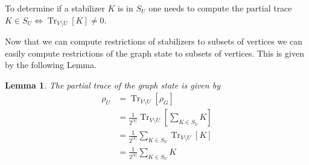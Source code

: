 \documentclass{article}
\newtheorem{lemma}[theorem]{Lemma}
\newtheorem{definition}[theorem]{Definition}
\DeclareMathOperator{\Tr}{Tr}
\newcommand{\ket}[1]{|#1\rangle}
\newcommand{\brackets}[1]{\left[ #1 \right]}
\newcommand{\partrace}[2]{\Tr_{#1} \brackets{ #2 }}
\begin{document}
To determine if a stabilizer $K$ is in $S_U$ one needs to compute the partial trace $K \in S_U \iff \partrace{V \setminus U}{K} \neq 0$.

Now that we can compute restrictions of stabilizers to subsets of vertices we can easily compute restrictions of the graph state to subsets of vertices. This is given by the following Lemma.
\begin{lemma}
    The partial trace of the graph state is given by
    \begin{align}
        \rho_U &= \partrace{V \setminus U}{\rho_G} \\
        &= \frac{1}{2^{|V|}} \partrace{V \setminus U}{\sum_{K \in S_V} K} \\
        &= \frac{1}{2^{|V|}} \sum_{K \in S_V} \partrace{V \setminus U}{ K} \\
        &= \frac{1}{2^{|V|}} \sum_{K \in S_U} K
    \end{align}
    
\end{lemma}


    
\end{document}
